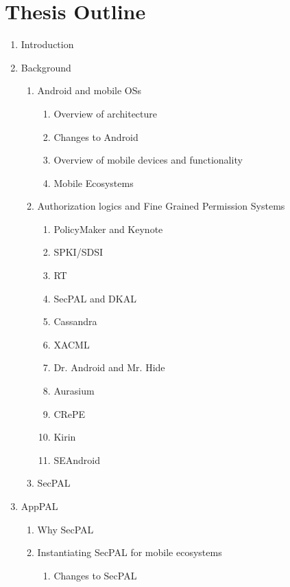 \documentclass[a4paper]{scrartcl}
\begin{document}



\pagebreak
\appendix
\section{Thesis Outline}
\label{sec:thesis-outline}

\begin{enumerate}
\item Introduction
\item Background
  \begin{enumerate}[2.1]
  \item Android and mobile OSs
    \begin{enumerate}[2.1.1]
    \item Overview of architecture
    \item Changes to Android
    \item Overview of mobile devices and functionality
    \item Mobile Ecosystems
    \end{enumerate}
  \item Authorization logics and Fine Grained Permission Systems
    \begin{enumerate}[{2.3.}1]
    \item PolicyMaker and Keynote
    \item SPKI/SDSI
    \item RT
    \item SecPAL and DKAL
    \item Cassandra
    \item XACML
    \item Dr. Android and Mr. Hide
    \item Aurasium
    \item CRePE
    \item Kirin
    \item SEAndroid
    \end{enumerate}
  \item SecPAL
  \end{enumerate}
\item AppPAL
  \begin{enumerate}[3.1]
  \item Why SecPAL
  \item Instantiating SecPAL for mobile ecosystems
    \begin{enumerate}[{3.2.}1]
    \item Changes to SecPAL

\end{enumerate}
\end{enumerate}
\end{enumerate}
\end{document}
